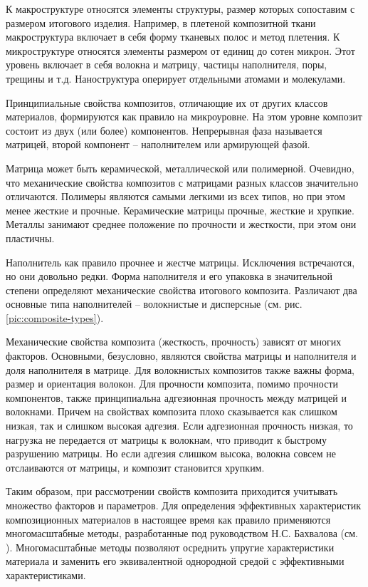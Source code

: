 К макроструктуре относятся элементы структуры, размер которых сопоставим с размером итогового изделия. Например, в плетеной композитной ткани макроструктура включает в себя форму тканевых полос и метод плетения. К микроструктуре относятся элементы размером от единиц до сотен микрон. Этот уровень включает в себя волокна и матрицу, частицы наполнителя, поры, трещины и т.д. Наноструктура оперирует отдельными атомами и молекулами.

Принципиальные свойства композитов, отличающие их от других классов материалов, формируются как правило на микроуровне. На этом уровне композит состоит из двух (или более) компонентов. Непрерывная фаза называется матрицей, второй компонент -- наполнителем или армирующей фазой.

Матрица может быть керамической, металлической или полимерной. Очевидно, что механические свойства композитов с матрицами разных классов значительно отличаются. Полимеры являются самыми легкими из всех типов, но при этом менее жесткие и прочные. Керамические матрицы прочные, жесткие и хрупкие. Металлы занимают среднее положение по прочности и жесткости, при этом они пластичны.

Наполнитель как правило прочнее и жестче матрицы. Исключения встречаются, но они довольно редки. Форма наполнителя и его упаковка в значительной степени определяют механические свойства итогового композита. Различают два основные типа наполнителей -- волокнистые и дисперсные (см. рис. \ref{pic:composite-types}).

Механические свойства композита (жесткость, прочность) зависят от многих факторов. Основными, безусловно, являются свойства матрицы и наполнителя и доля наполнителя в матрице. Для волокнистых композитов также важны форма, размер и ориентация волокон. Для прочности композита, помимо прочности компонентов, также принципиальна адгезионная прочность между матрицей и волокнами. Причем на свойствах композита плохо сказывается как слишком низкая, так и слишком высокая адгезия. Если адгезионная прочность низкая, то нагрузка не передается от матрицы к волокнам, что приводит к быстрому разрушению матрицы. Но если адгезия слишком высока, волокна совсем не отслаиваются от матрицы, и композит становится хрупким.

Таким образом, при рассмотрении свойств композита приходится учитывать множество факторов и параметров. Для определения эффективных характеристик композиционных материалов в настоящее время как правило применяются многомасштабные методы, разработанные под руководством Н.С. Бахвалова (см. \cite{bahvalov}). Многомасштабные методы позволяют осреднить упругие характеристики материала и заменить его эквивалентной однородной средой с эффективными характеристиками.

